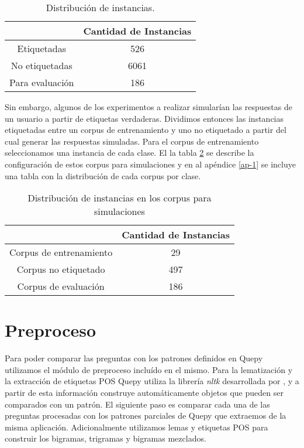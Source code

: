\begin{table}[h!]\label{dist-corpus}
\centering
\begin{tabular}{c c}
     & Cantidad de Instancias\\ [0.5ex]
    \hline
    Etiquetadas & 526 \\ [0.5ex]
    No etiquetadas & 6061 \\ [0.5ex]
    Para evaluación & 186 \\[1ex]
    \hline
\end{tabular}
\caption{Distribución de instancias.}
\end{table}

Sin embargo, algunos de los experimentos a realizar simularían las respuestas de un usuario a partir de etiquetas verdaderas. Dividimos entonces las instancias etiquetadas entre un corpus de entrenamiento y uno no etiquetado a partir del cual generar las respuestas simuladas. Para el corpus de entrenamiento seleccionamos una instancia de cada clase. El la tabla \ref{corpus-para-simulacion} se describe la configuración de estos corpus para simulaciones y en al apéndice \ref{ap-1} se incluye una tabla con la distribución de cada corpus por clase.


\begin{table}[h!]\label{corpus-para-simulacion}
\centering
\begin{tabular}{c c}
     & Cantidad de Instancias\\ [0.5ex]
    \hline
    Corpus de entrenamiento & 29 \\ [0.5ex]
    Corpus no etiquetado & 497 \\ [0.5ex]
    Corpus de evaluación & 186 \\[1ex]
    \hline
\end{tabular}
\caption{Distribución de instancias en los corpus para simulaciones}
\end{table}

\section{Preproceso}

Para poder comparar las preguntas con los patrones definidos en Quepy utilizamos el módulo de preproceso incluído en el mismo. Para la lematización y la extracción de etiquetas POS Quepy utiliza la librería \textit{nltk} desarrollada por \citet{nltk}, y a partir de esta información construye automáticamente objetos que pueden ser comparados con un patrón. El siguiente paso es comparar cada una de las preguntas procesadas con los patrones parciales de Quepy que extraemos de la misma aplicación. Adicionalmente utilizamos lemas y etiquetas POS para construir los bigramas, trigramas y bigramas mezclados.

